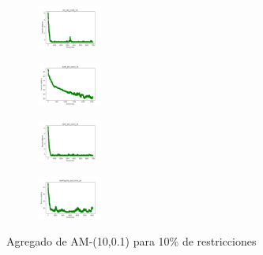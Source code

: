 \begin{figure}[H]
\begin{subfigure}
    \end{subfigure}
    \hfill
    \begin{subfigure}
        \centering
        \includegraphics[width=0.234\textwidth]{img/am01/iris_set_const_10_3773969821_cost.png}
    \end{subfigure}
    \hfill
    \begin{subfigure}
        \centering
        \includegraphics[width=0.234\textwidth]{img/am01/ecoli_set_const_10_3773969821_cost.png}
    \end{subfigure}
    \hfill
    \begin{subfigure}
        \centering
        \includegraphics[width=0.234\textwidth]{img/am01/rand_set_const_10_3773969821_cost.png}
    \end{subfigure}
    \hfill
    \begin{subfigure}
        \centering
        \includegraphics[width=0.234\textwidth]{img/am01/newthyroid_set_const_10_3773969821_cost.png}
    \end{subfigure}
    \caption{Agregado de AM-(10,0.1) para 10\% de restricciones}
\end{figure}


\vspace*{\fill}
\newpage
\vspace*{\fill}

